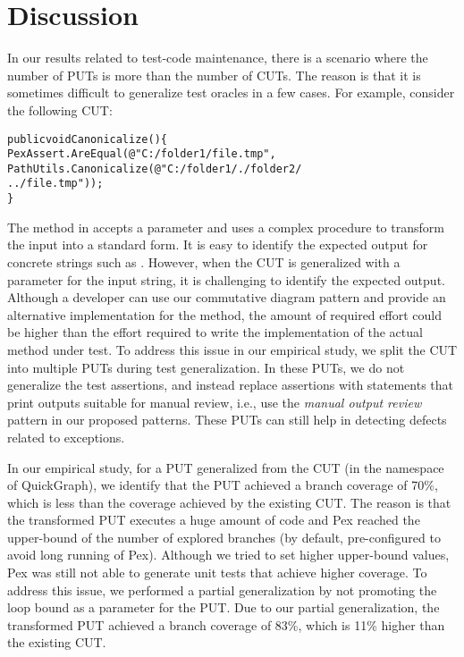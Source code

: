 \section{Discussion} 
\label{sec:limitations}

In our results related to test-code maintenance, there is a scenario where the number of PUTs is more than the number of CUTs. The reason is that it is sometimes difficult to generalize test oracles in a few cases. For example, consider the following CUT:\vspace*{-1.5ex}

\begin{CodeOut}
\begin{alltt}
public void Canonicalize() \{
\hspace*{0.1in}PexAssert.AreEqual(@"C:/folder1/file.tmp",
\hspace*{0.3in}PathUtils.Canonicalize(@"C:/folder1/./folder2/
\hspace*{0.3in}../file.tmp")); 
\}
\end{alltt}
\end{CodeOut} \vspace*{-1.5ex}

\noindent The  method in  accepts a  parameter and uses a complex procedure to transform the input into a standard form. It is easy to identify the expected output for concrete strings such as . However, when the CUT is generalized with a parameter for the input string, it is challenging to identify the expected output. Although a developer can use our commutative diagram pattern and provide an alternative implementation for the  method, the amount of required effort could be higher than the effort required to write the implementation of the actual method under test. To address this issue in our empirical study, we split the CUT into multiple PUTs during test generalization. In these PUTs, we do not generalize the test assertions, and instead replace assertions with statements that print outputs suitable for manual review, i.e., use the \emph{manual output review} pattern in our proposed patterns. These PUTs can still help in detecting defects related to exceptions.

In our empirical study, for a PUT generalized from the CUT  (in the  namespace of QuickGraph), we identify that the PUT achieved a branch coverage of 70\%, which is less than the coverage achieved by the existing CUT. The reason is that the transformed PUT executes a huge amount of code and Pex reached the upper-bound of the number of explored branches (by default, pre-configured to avoid long running of Pex). Although we tried to set higher upper-bound values, Pex was still not able to generate unit tests that achieve higher coverage. To address this issue, we performed a partial generalization by not promoting the loop bound as a parameter for the PUT. Due to our partial generalization, the transformed PUT achieved a branch coverage of 83\%, which is 11\% higher than the existing CUT.

